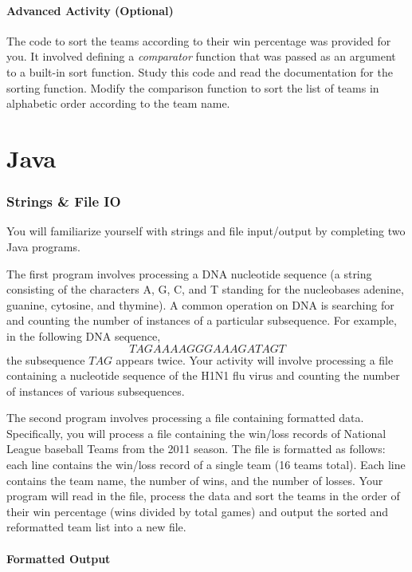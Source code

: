 \documentclass[12pt]{scrartcl}
\begin{document}
\subsection*{Advanced Activity (Optional)}
	
The code to sort the teams according to their win percentage was 
provided for you.  It involved defining a \emph{comparator} function 
that was passed as an argument to a built-in sort function.  Study 
this code and read the documentation for the sorting function.  
Modify the comparison function to sort the list of teams in alphabetic 
order according to the team name.

\newpage
\part*{Java}

\section*{Strings \& File IO}

You will familiarize yourself with strings and file input/output 
by completing two Java programs.  

The first program involves processing a DNA nucleotide sequence (a 
string consisting of the characters A, G, C, and T standing for the 
nucleobases adenine, guanine, cytosine, and thymine).  A common 
operation on DNA is searching for and counting the number of instances 
of a particular subsequence.  For example, in the following DNA 
sequence, 
$$TAGAAAAGGGAAAGATAGT$$
the subsequence $TAG$ appears twice.  Your activity will involve 
processing a file containing a nucleotide sequence of the H1N1 flu 
virus and counting the number of instances of various subsequences.

The second program involves processing a file containing formatted 
data.  Specifically, you will process a file containing the win/loss 
records of National League baseball Teams from the 2011 season.  The 
file is formatted as follows: each line contains the win/loss record 
of a single team (16 teams total).  Each line contains the team name, 
the number of wins, and the number of losses.  Your program will read 
in the file, process the data and sort the teams in the order of their 
win percentage (wins divided by total games) and output the sorted and 
reformatted team list into a new file.

\subsection*{Formatted Output}
\end{document}
